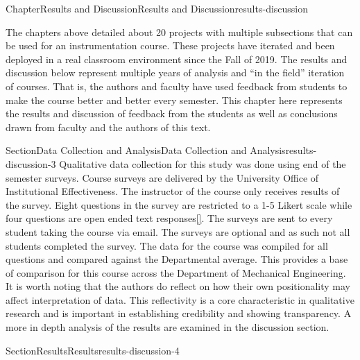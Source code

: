 \documentclass[oneside,10pt,]{book}
\newcommand{\xreffont}{\relax}
\newcommand{\linkhilite}[1]{\underline{#1}}
\numberwithin{equation}{section}
\begin{document}
\begin{chapterptx}{Chapter}{Results and Discussion}{}{Results and Discussion}{}{}{results-discussion}
\renewcommand*{\chaptername}{Chapter}
\begin{introduction}{}%
The chapters above detailed about 20 projects with multiple subsections that can be used for an instrumentation course. These projects have iterated and been deployed in a real classroom environment since the Fall of 2019. The results and discussion below represent multiple years of analysis and \textquotedblleft{}in the field\textquotedblright{} iteration of courses. That is, the authors and faculty have used feedback from students to make the course better and better every semester. This chapter here represents the results and discussion of feedback from the students as well as conclusions drawn from faculty and the authors of this text.%
\end{introduction}%
%
%
\typeout{************************************************}
\typeout{************************************************}
%
\begin{sectionptx}{Section}{Data Collection and Analysis}{}{Data Collection and Analysis}{}{}{results-discussion-3}
Qualitative data collection for this study was done using end of the semester surveys. Course surveys are delivered by the University Office of Institutional Effectiveness. The instructor of the course only receives results of the survey. Eight questions in the survey are restricted to a 1-5 Likert scale while four questions are open ended text responses\hyperlink{likert}{\linkhilite{[{\xreffont 49}]}}. The surveys are sent to every student taking the course via email. The surveys are optional and as such not all students completed the survey. The data for the course was compiled for all questions and compared against the Departmental average. This provides a base of comparison for this course across the Department of Mechanical Engineering. It is worth noting that the authors do reflect on how their own positionality may affect interpretation of data. This reflectivity is a core characteristic in qualitative research and is important in establishing credibility and showing transparency. A more in depth analysis of the results are examined in the discussion section.%
\end{sectionptx}
%
%
\typeout{************************************************}
\typeout{************************************************}
%
\begin{sectionptx}{Section}{Results}{}{Results}{}{}{results-discussion-4}

\end{sectionptx}
\end{chapterptx}
\end{document}

